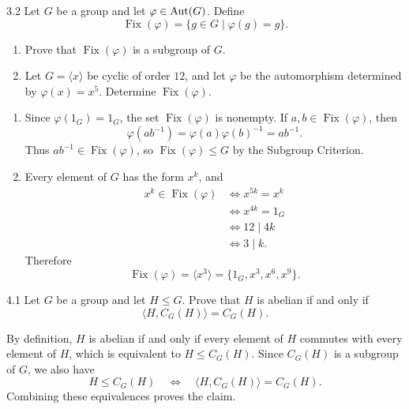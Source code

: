 \documentclass[11pt,oneside]{article}
\begin{document}
\begin{problem}{3.2}
Let $G$ be a group and let $\varphi\in\operatorname{Aut}(G)$. Define
\[
    \operatorname{Fix}(\varphi)=\{g\in G\mid\varphi(g)=g\}.
\]
\begin{enumerate}[label=(\alph*),leftmargin=2.5em,itemsep=0.25em,topsep=0.4em]
    \item Prove that $\operatorname{Fix}(\varphi)$ is a subgroup of $G$.
    \item Let $G=\langle x\rangle$ be cyclic of order $12$, and let $\varphi$ be the automorphism determined by $\varphi(x)=x^5$. Determine $\operatorname{Fix}(\varphi)$.
\end{enumerate}
\end{problem}

\begin{solution}
\begin{enumerate}[label=(\alph*),leftmargin=2.5em,itemsep=0.45em,topsep=0.2em]
    \item Since $\varphi(1_G)=1_G$, the set $\operatorname{Fix}(\varphi)$ is nonempty. If $a,b\in\operatorname{Fix}(\varphi)$, then
    \[
        \varphi(ab^{-1})=\varphi(a)\varphi(b)^{-1}=ab^{-1}.
    \]
    Thus $ab^{-1}\in\operatorname{Fix}(\varphi)$, so $\operatorname{Fix}(\varphi)\le G$ by the Subgroup Criterion.

    \item Every element of $G$ has the form $x^k$, and
    \[
    \begin{aligned}
        x^k\in\operatorname{Fix}(\varphi)
        &\iff x^{5k}=x^k\\
        &\iff x^{4k}=1_G\\
        &\iff 12\mid4k\\
        &\iff 3\mid k.
    \end{aligned}
    \]
    Therefore
    \[
        \operatorname{Fix}(\varphi)
        =\langle x^3\rangle
        =\{1_G,x^3,x^6,x^9\}.
    \]
\end{enumerate}
\end{solution}


\begin{problem}{4.1}
Let $G$ be a group and let $H\le G$. Prove that $H$ is abelian if and only if
\[
    \langle H,C_G(H)\rangle=C_G(H).
\]
\end{problem}

\begin{solution}
By definition, $H$ is abelian if and only if every element of $H$ commutes with every element of $H$, which is equivalent to $H\le C_G(H)$. Since $C_G(H)$ is a subgroup of $G$, we also have
\[
    H\le C_G(H)
    \quad\Longleftrightarrow\quad
    \langle H,C_G(H)\rangle=C_G(H).
\]
Combining these equivalences proves the claim.
\end{solution}
\end{document}
